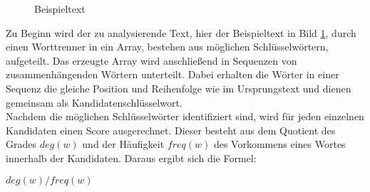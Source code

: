 		\begin{figure}[h!]
			\caption{Beispieltext}
			\label{fig:text}
		\end{figure}
		
		Zu Beginn wird der zu analysierende Text, hier der Beispieltext in  Bild \ref{fig:text}, durch einen Worttrenner in ein Array, bestehen aus möglichen Schlüsselwörtern, aufgeteilt. Das erzeugte Array wird anschließend in Sequenzen von zusammenhängenden Wörtern unterteilt. Dabei erhalten die Wörter in einer Sequenz die gleiche Position und Reihenfolge wie im Ursprungstext und dienen gemeinsam als Kandidatenschlüsselwort.\cite{rose2010automatic}\\		
		Nachdem die möglichen Schlüsselwörter identifiziert sind, wird für jeden einzelnen Kandidaten einen Score ausgerechnet. Dieser besteht aus dem Quotient des Grades $deg(w)$ und der Häufigkeit $freq(w)$ des Vorkommens eines Wortes innerhalb der Kandidaten. Daraus ergibt sich die Formel:
		\begin{center}
			$deg(w)/freq(w) $
		\end{center}	
		
